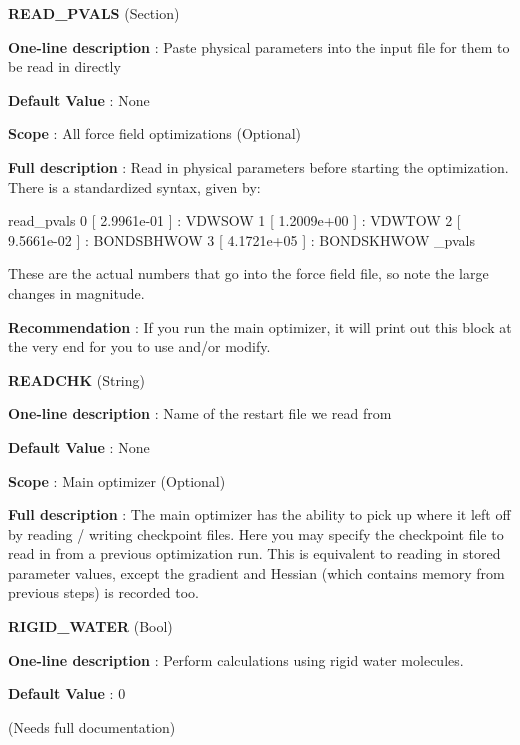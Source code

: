 \begin{DoxyItemize}
\item {\bfseries  R\-E\-A\-D\-\_\-\-P\-V\-A\-L\-S } (Section) \par
{\bfseries  One-\/line description }\-: Paste physical parameters into the input file for them to be read in directly \par
{\bfseries  Default Value }\-: None \par
{\bfseries  Scope }\-: All force field optimizations (Optional) \par
{\bfseries  Full description }\-: Read in physical parameters before starting the optimization. There is a standardized syntax, given by\-: \begin{DoxyVerb}read_pvals
 0 [  2.9961e-01 ] : VDWSOW
 1 [  1.2009e+00 ] : VDWTOW
 2 [  9.5661e-02 ] : BONDSBHWOW
 3 [  4.1721e+05 ] : BONDSKHWOW
 \read_pvals \end{DoxyVerb}
 These are the actual numbers that go into the force field file, so note the large changes in magnitude. \par
{\bfseries  Recommendation }\-: If you run the main optimizer, it will print out this block at the very end for you to use and/or modify.\end{DoxyItemize}
\begin{DoxyItemize}
\item {\bfseries  R\-E\-A\-D\-C\-H\-K } (String) \par
{\bfseries  One-\/line description }\-: Name of the restart file we read from \par
{\bfseries  Default Value }\-: None \par
{\bfseries  Scope }\-: Main optimizer (Optional) \par
{\bfseries  Full description }\-: The main optimizer has the ability to pick up where it left off by reading / writing checkpoint files. Here you may specify the checkpoint file to read in from a previous optimization run. This is equivalent to reading in stored parameter values, except the gradient and Hessian (which contains memory from previous steps) is recorded too.\end{DoxyItemize}
\begin{DoxyItemize}
\item {\bfseries  R\-I\-G\-I\-D\-\_\-\-W\-A\-T\-E\-R } (Bool) \par
{\bfseries  One-\/line description }\-: Perform calculations using rigid water molecules. \par
{\bfseries  Default Value }\-: 0 \par
(Needs full documentation)\end{DoxyItemize}
